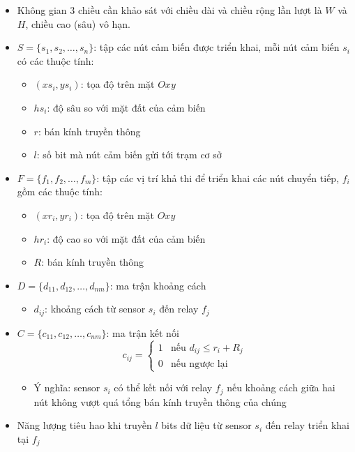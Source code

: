 \begin{itemize}
    \item Không gian 3 chiều cần khảo sát với chiều dài và chiều rộng lần lượt là $W$ và $H$, chiều cao (sâu) vô hạn.
    \item $S = \{s_1, s_2,…, s_n\}$: tập các nút cảm biến được triển khai, mỗi nút cảm biến $s_i$ có các thuộc tính:
    \begin{itemize}
        \item[] $(xs_i, ys_i)$: tọa độ trên mặt $Oxy$
        \item[] $hs_i$: độ sâu so với mặt đất của cảm biến
        \item[] $r$: bán kính truyền thông 
        \item[] $l$: số bit mà nút cảm biến gửi tới trạm cơ sở
    \end{itemize}
    \item $F = \{f_1, f_2,…, f_m\}$: tập các vị trí khả thi để triển khai các nút chuyển tiếp, $f_i$ gồm các thuộc tính:
    \begin{itemize}
        \item[] $(xr_i, yr_i)$: tọa độ trên mặt $Oxy$
        \item[] $hr_i$: độ cao so với mặt đất của cảm biến
        \item[] $R$: bán kính truyền thông 
    \end{itemize}
    \item $D = \{d_{11}, d_{12},…, d_{nm}\}$: ma trận khoảng cách 
    \begin{itemize}
        \item[] $d_{ij}$: khoảng cách từ sensor $s_i$ đến relay $f_j$
    \end{itemize}
    \item $C = \{c_{11}, c_{12},…, c_{nm}\}$: ma trận kết nối
    \begin{equation} 
        c_{ij} = \begin{cases}
            1 & \textrm{nếu $d_{ij} \leq r_i + R_j$}\\
            0 & \textrm{nếu ngược lại}
        \end{cases}
        \label{eqn:simple_one} 
    \end{equation}     
    \begin{itemize}
        \item[] Ý nghĩa: sensor $s_i$ có thể kết nối với relay $f_j$ nếu khoảng cách giữa hai nút không vượt quá tổng bán kính truyền thông của chúng
    \end{itemize}
    \item Năng lượng tiêu hao khi truyền $l$ bits dữ liệu từ sensor $s_i$ đến relay triển khai tại $f_j$

\end{itemize}
